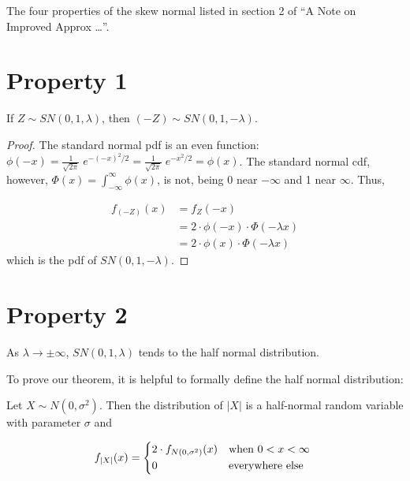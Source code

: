 The four properties of the skew normal listed in section 2 of ``A Note on Improved Approx \ldots''.

\section{Property 1}
\begin{thm*}
  If $Z \sim SN(0, 1, \lambda)$, then $(-Z) \sim SN(0, 1, -\lambda)$.
\end{thm*}

\begin{proof}
  
  The standard normal pdf is an even function: $\phi(-x) = \frac{1}{\sqrt{2\pi}}\;e^{-(-x)^2/2} =
  \frac{1}{\sqrt{2\pi}}\;e^{-x^2/2} = \phi(x)$. The standard normal cdf, however, $\Phi(x) =
  \int_{-\infty}^\infty \phi(x)$, is not, being 0 near $-\infty$ and 1 near $\infty$. Thus,
  
  \begin{align*}
    f_{(-Z)}(x) &= f_Z(-x) \\
    & = 2 \cdot \phi(-x) \cdot \Phi (-\lambda x) \\
    & = 2 \cdot \phi(x) \cdot \Phi (-\lambda x)
  \end{align*}
  which is the pdf of $SN(0, 1, -\lambda)$.
\end{proof}

\section{Property 2}
\begin{thm*}
  As $\lambda \to \pm \infty$, $SN(0, 1, \lambda)$ tends to the half normal distribution.
\end{thm*}

To prove our theorem, it is helpful to formally define the half normal distribution:

\begin{lemma*}
  Let $X \sim N(0, \sigma^2)$. Then the distribution of $|X|$ is a half-normal random variable
  with parameter $\sigma$ and

  \[
  f_{|X|}(x) =
  \begin{dcases*}
    2 \cdot f_{N(0, \sigma^2)}(x) & when $0 < x < \infty$ \\
    0 & everywhere else
  \end{dcases*}
  \]
\end{lemma*}

